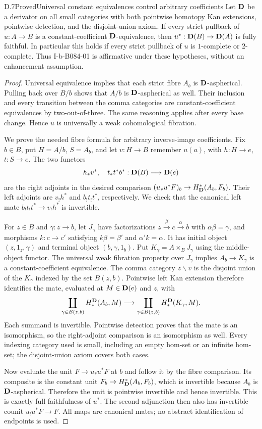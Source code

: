 \begin{claim}{D.7}{Proved}{Universal constant equivalences control arbitrary coefficients}
Let $\mathbf D$ be a derivator on all small categories with both pointwise homotopy Kan extensions, pointwise detection, and the disjoint-union axiom. If every strict pullback of $u:A\to B$ is a constant-coefficient $\mathbf D$-equivalence, then $u^*:\mathbf D(B)\to\mathbf D(A)$ is fully faithful. In particular this holds if every strict pullback of $u$ is $1$-complete or $2$-complete. Thus I-b-B084-01 is affirmative under these hypotheses, without an enhancement assumption.
\end{claim}
\begin{proof}
Universal equivalence implies that each strict fibre $A_b$ is $\mathbf D$-aspherical. Pulling back over $B/b$ shows that $A/b$ is $\mathbf D$-aspherical as well. Their inclusion and every transition between the comma categories are constant-coefficient equivalences by two-out-of-three. The same reasoning applies after every base change. Hence $u$ is universally a weak cohomological fibration.

We prove the needed fibre formula for arbitrary inverse-image coefficients. Fix $b\in B$, put $H=A/b$, $S=A_b$, and let $v:H\to B$ remember $u(a)$, with $h:H\to e$, $t:S\to e$. The two functors
\[
 h_*v^*,\quad t_*t^*b^*:\mathbf D(B)\longrightarrow\mathbf D(e)
\]
are the right adjoints in the desired comparison
$(u_*u^*F)_b\to H^*_{\mathbf D}(A_b,F_b)$.
Their left adjoints are $v_!h^*$ and $b_!t_!t^*$, respectively. We check that the canonical left mate $b_!t_!t^*\to v_!h^*$ is invertible.

For $z\in B$ and $\gamma:z\to b$, let $J_\gamma$ have factorizations $z\xrightarrow{\beta}c\xrightarrow{\alpha}b$ with $\alpha\beta=\gamma$, and morphisms $k:c\to c'$ satisfying $k\beta=\beta'$ and $\alpha'k=\alpha$. It has initial object $(z,1_z,\gamma)$ and terminal object $(b,\gamma,1_b)$. Put $K_\gamma=A\times_BJ_\gamma$ using the middle-object functor. The universal weak fibration property over $J_\gamma$ implies $A_b\to K_\gamma$ is a constant-coefficient equivalence. The comma category $z\backslash v$ is the disjoint union of the $K_\gamma$ indexed by the set $B(z,b)$. Pointwise left Kan extension therefore identifies the mate, evaluated at $M\in\mathbf D(e)$ and $z$, with
\[
 \coprod_{\gamma\in B(z,b)}H_*^{\mathbf D}(A_b,M)
 \longrightarrow
 \coprod_{\gamma\in B(z,b)}H_*^{\mathbf D}(K_\gamma,M).
\]
Each summand is invertible. Pointwise detection proves that the mate is an isomorphism, so the right-adjoint comparison is an isomorphism as well. Every indexing category used is small, including an empty hom-set or an infinite hom-set; the disjoint-union axiom covers both cases.

Now evaluate the unit $F\to u_*u^*F$ at $b$ and follow it by the fibre comparison. Its composite is the constant unit $F_b\to H^*_{\mathbf D}(A_b,F_b)$, which is invertible because $A_b$ is $\mathbf D$-aspherical. Therefore the unit is pointwise invertible and hence invertible. This is exactly full faithfulness of $u^*$. The second adjunction then also has invertible counit $u_!u^*F\to F$. All maps are canonical mates; no abstract identification of endpoints is used.
\end{proof}

